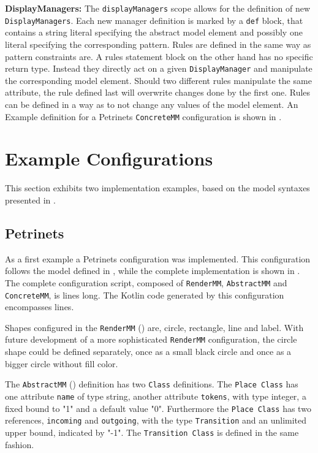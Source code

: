 \textbf{DisplayManagers:} The \texttt{displayManagers} scope allows for the definition of new \texttt{DisplayManagers}. Each new manager definition is marked by a \texttt{def} block, that contains a string literal specifying the abstract model element and possibly one literal specifying the corresponding pattern. 
Rules are defined in the same way as pattern constraints are. A rules statement block on the other hand has no specific return type. Instead they directly act on a given \texttt{DisplayManager} and manipulate the corresponding model element. Should two different rules manipulate the same attribute, the rule defined last will overwrite changes done by the first one. Rules can be defined in a way as to not change any values of the model element. An Example definition for a Petrinets \texttt{ConcreteMM} configuration is shown in .

\section{Example Configurations}
\label{sec:example-configs}
This section exhibits two implementation examples, based on the model syntaxes presented in .

\subsection{Petrinets}
\label{sec:petri-impl}
As a first example a Petrinets configuration was implemented. This configuration follows the model defined in , while the complete implementation is shown in . The complete configuration script, composed of \texttt{RenderMM}, \texttt{AbstractMM} and \texttt{ConcreteMM}, is \petriConfigLoC lines long. The Kotlin code generated by this configuration encompasses \petriGeneratedLoC lines. 

Shapes configured in the \texttt{RenderMM} () are, circle, rectangle, line and label. With future development of a more sophisticated \texttt{RenderMM} configuration, the circle shape could be defined separately, once as a small black circle and once as a bigger circle without fill color. 

The \texttt{AbstractMM} () definition has two \texttt{Class} definitions. The \texttt{Place Class} has one attribute \texttt{name} of type string, another attribute \texttt{tokens}, with type integer, a fixed bound to "1" and a default value "0". Furthermore the \texttt{Place Class} has two references, \texttt{incoming} and \texttt{outgoing}, with the type \texttt{Transition} and an unlimited upper bound, indicated by "-1". The \texttt{Transition Class} is defined in the same fashion.

